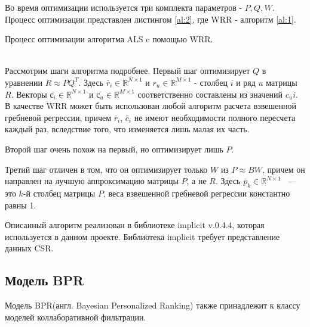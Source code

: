 \documentclass[14pt]{mmcs_article}
\begin{document}
Во время оптимизации используется три комплекта параметров - $P, Q, W$. Процесс оптимизации представлен листингом \ref{al:2}, где WRR - алгоритм \ref{al:1}.\\
\begin{algorithm}[H]\label{al:2}
	\caption{Процесс оптимизации алгоритма ALS c помощью WRR.}
\end{algorithm}
\ \\
Рассмотрим шаги алгоритма подробнее.
Первый шаг оптимизирует $Q$ в уравнении $R \approx PQ^T$. Здесь $\bar r_i \in \mathbb{R}^{N \times 1}$  и  $r_u \in \mathbb{R}^{M \times 1}$ - столбец $i$ и ряд $u$ матрицы $R$. Векторы $ \bar{с_i} \in \mathbb{R}^{N \times 1}$ и $\bar{с_u} \in \mathbb{R}^{M \times 1}$ соответственно составлены из значений $c_ui$. В качестве WRR может быть использован любой алгоритм расчета взвешенной гребневой регрессии, причем $\bar r_i$, $\bar c_i$ не имеют необходимости полного пересчета каждый раз, вследствие того, что изменяется лишь малая их часть. 

Второй шаг очень похож на первый, но оптимизирует лишь $P$. 

Третий шаг отличен в том, что он оптимизирует только $W$ из $P \approx BW$, причем он направлен на лучшую аппроксимацию матрицы $P$, а не $R$. Здесь  $\bar p_k \in \mathbb{R}^{N \times 1}$ ~--- это $k$-й столбец матрицы $P$, веса взвешенной гребневой регрессии константно равны 1.

Описанный алгоритм реализован в библиотеке implicit v.0.4.4, которая используется в данном проекте. Библиотека implicit требует представление данных CSR.


\subsection{Модель BPR}
Модель BPR(англ. Bayesian Personalized Ranking) также принадлежит к классу моделей коллаборативной фильтрации. 
\end{document}
